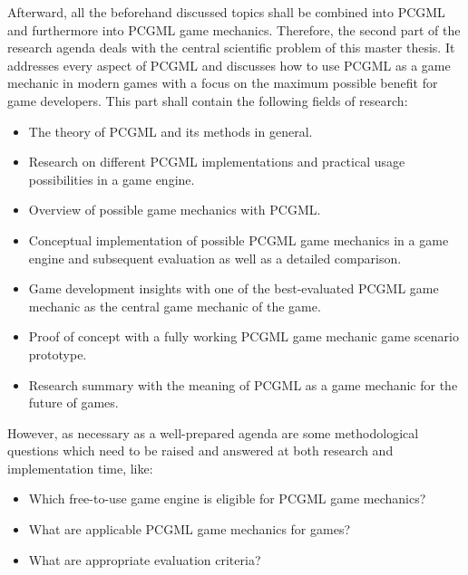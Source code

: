 \documentclass[MGS,Master,english]{twbook}%
\begin{document}
Afterward, all the beforehand discussed topics shall be combined into \ac{PCGML} and furthermore into \ac{PCGML} game mechanics. Therefore, the second part of the research agenda deals with the central scientific problem of this master thesis. It addresses every aspect of \ac{PCGML} and discusses how to use \ac{PCGML} as a game mechanic in modern games with a focus on the maximum possible benefit for game developers. This part shall contain the following fields of research: 
\begin{itemize}
	\item The theory of \ac{PCGML} and its methods in general.
	\item Research on different \ac{PCGML} implementations and practical usage possibilities in a game engine.
	\item Overview of possible game mechanics with \ac{PCGML}.
	\item Conceptual implementation of possible \ac{PCGML} game mechanics in a game engine and subsequent evaluation as well as a detailed comparison.
	\item Game development insights with one of the best-evaluated \ac{PCGML} game mechanic as the central game mechanic of the game.
	\item Proof of concept with a fully working \ac{PCGML} game mechanic game scenario prototype.
	\item Research summary with the meaning of \ac{PCGML} as a game mechanic for the future of games. 
\end{itemize}

However, as necessary as a well-prepared agenda are some methodological questions which need to be raised and answered at both research and implementation time, like:
\begin{itemize}
	\item Which free-to-use game engine is eligible for \ac{PCGML} game mechanics?
	\item What are applicable \ac{PCGML} game mechanics for games?
	\item What are appropriate evaluation criteria? 
\end{itemize} 
\end{document}
